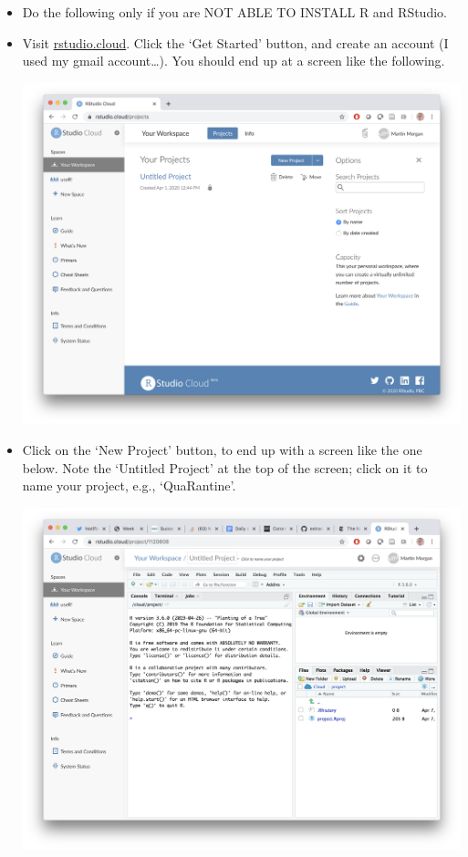 \documentclass[
]{book}
\begin{document}
\begin{itemize}
\item
  Do the following only if you are NOT ABLE TO INSTALL R and RStudio.
\item
  Visit \href{https://rstudio.cloud/}{rstudio.cloud}. Click the `Get Started' button, and create an account (I used my gmail account\ldots). You should end up at a screen like the following.

  \includegraphics{images/RStudio-cloud-screenshot.png}
\item
  Click on the `New Project' button, to end up with a screen like the one below. Note the `Untitled Project' at the top of the screen; click on it to name your project, e.g., `QuaRantine'.

  \includegraphics{images/RStudio-cloud-project.png}
\end{itemize}
\end{document}
